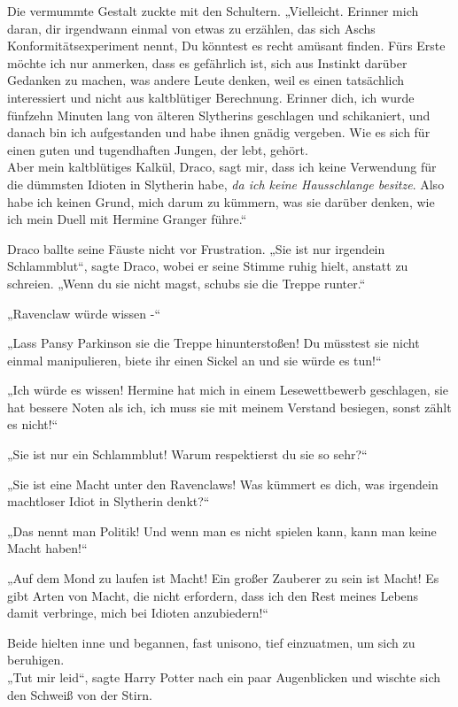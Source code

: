 {Die vermummte Gestalt zuckte mit den Schultern. „Vielleicht. Erinner mich daran, dir irgendwann einmal von etwas zu erzählen, das sich Aschs Konformitätsexperiment nennt, Du könntest es recht amüsant finden. Fürs Erste möchte ich nur anmerken, dass es gefährlich ist, sich aus Instinkt darüber Gedanken zu machen, was andere Leute denken, weil es einen tatsächlich interessiert und nicht aus kaltblütiger Berechnung. Erinner dich, ich wurde fünfzehn Minuten lang von älteren Slytherins geschlagen und schikaniert, und danach bin ich aufgestanden und habe ihnen gnädig vergeben. Wie es sich für einen guten und tugendhaften Jungen, der lebt, gehört.\\ Aber mein kaltblütiges Kalkül, Draco, sagt mir, dass ich keine Verwendung für die dümmsten Idioten in Slytherin habe, \emph{da ich keine Hausschlange besitze}. Also habe ich keinen Grund, mich darum zu kümmern, was sie darüber denken, wie ich mein Duell mit Hermine Granger führe.“

Draco ballte seine Fäuste nicht vor Frustration. „Sie ist nur irgendein Schlammblut“, sagte Draco, wobei er seine Stimme ruhig hielt, anstatt zu schreien. „Wenn du sie nicht magst, schubs sie die Treppe runter.“

„Ravenclaw würde wissen -“

„Lass Pansy Parkinson sie die Treppe hinunterstoßen! Du müsstest sie nicht einmal manipulieren, biete ihr einen Sickel an und sie würde es tun!“

„Ich würde es wissen! Hermine hat mich in einem Lesewettbewerb geschlagen, sie hat bessere Noten als ich, ich muss sie mit meinem Verstand besiegen, sonst zählt es nicht!“

„Sie ist nur ein Schlammblut! Warum respektierst du sie so sehr?“

„Sie ist eine Macht unter den Ravenclaws! Was kümmert es dich, was irgendein machtloser Idiot in Slytherin denkt?“

„Das nennt man Politik! Und wenn man es nicht spielen kann, kann man keine Macht haben!“

„Auf dem Mond zu laufen ist Macht! Ein großer Zauberer zu sein ist Macht! Es gibt Arten von Macht, die nicht erfordern, dass ich den Rest meines Lebens damit verbringe, mich bei Idioten anzubiedern!“

Beide hielten inne und begannen, fast unisono, tief einzuatmen, um sich zu beruhigen.\\ „Tut mir leid“, sagte Harry Potter nach ein paar Augenblicken und wischte sich den Schweiß von der Stirn.

}
